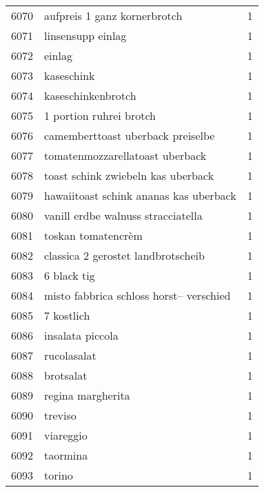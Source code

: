 \begin{tabular}{llr}
6070 &                       aufpreis 1 ganz kornerbrotch &      1 \\
6071 &                                  linsensupp einlag &      1 \\
6072 &                                             einlag &      1 \\
6073 &                                         kaseschink &      1 \\
6074 &                                 kaseschinkenbrotch &      1 \\
6075 &                            1 portion ruhrei brotch &      1 \\
6076 &                  camemberttoast uberback preiselbe &      1 \\
6077 &                    tomatenmozzarellatoast uberback &      1 \\
6078 &                 toast schink zwiebeln kas uberback &      1 \\
6079 &             hawaiitoast schink ananas kas uberback &      1 \\
6080 &                 vanill erdbe walnuss stracciatella &      1 \\
6081 &                                 toskan tomatencrèm &      1 \\
6082 &                 classica 2 gerostet landbrotscheib &      1 \\
6083 &                                        6 black tig &      1 \\
6084 &            misto fabbrica schloss horst– verschied &      1 \\
6085 &                                         7 kostlich &      1 \\
6086 &                                   insalata piccola &      1 \\
6087 &                                        rucolasalat &      1 \\
6088 &                                          brotsalat &      1 \\
6089 &                                  regina margherita &      1 \\
6090 &                                            treviso &      1 \\
6091 &                                          viareggio &      1 \\
6092 &                                           taormina &      1 \\
6093 &                                             torino &      1 \\

\end{tabular}
